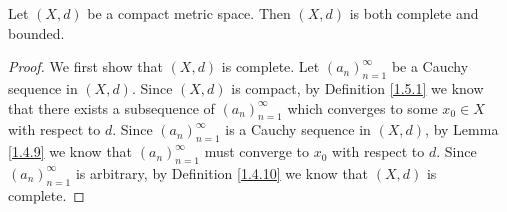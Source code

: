 \begin{proposition}\label{1.5.5}
    Let \((X, d)\) be a compact metric space.
    Then \((X, d)\) is both complete and bounded.
\end{proposition}

\begin{proof}
    We first show that \((X, d)\) is complete.
    Let \((a_n)_{n = 1}^\infty\) be a Cauchy sequence in \((X, d)\).
    Since \((X, d)\) is compact, by Definition \ref{1.5.1} we know that there exists a subsequence of \((a_n)_{n = 1}^\infty\) which converges to some \(x_0 \in X\) with respect to \(d\).
    Since \((a_n)_{n = 1}^\infty\) is a Cauchy sequence in \((X, d)\), by Lemma \ref{1.4.9} we know that \((a_n)_{n = 1}^\infty\) must converge to \(x_0\) with respect to \(d\).
    Since \((a_n)_{n = 1}^\infty\) is arbitrary, by Definition \ref{1.4.10} we know that \((X, d)\) is complete.


\end{proof}
